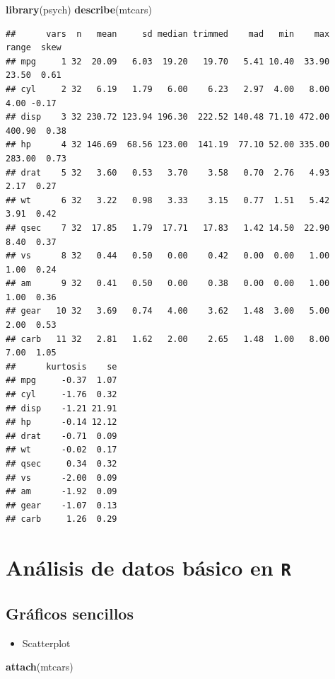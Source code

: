 \documentclass[]{book}
\newenvironment{Shaded}{\begin{snugshade}}{\end{snugshade}}
\newcommand{\KeywordTok}[1]{\textcolor[rgb]{0.13,0.29,0.53}{\textbf{#1}}}
\newcommand{\NormalTok}[1]{#1}
\providecommand{\tightlist}{%
  \setlength{\itemsep}{0pt}\setlength{\parskip}{0pt}}
\begin{document}
\begin{Shaded}
\begin{Highlighting}[]
\KeywordTok{library}\NormalTok{(psych)}
\KeywordTok{describe}\NormalTok{(mtcars)}
\end{Highlighting}
\end{Shaded}

\begin{verbatim}
##      vars  n   mean     sd median trimmed    mad   min    max  range  skew
## mpg     1 32  20.09   6.03  19.20   19.70   5.41 10.40  33.90  23.50  0.61
## cyl     2 32   6.19   1.79   6.00    6.23   2.97  4.00   8.00   4.00 -0.17
## disp    3 32 230.72 123.94 196.30  222.52 140.48 71.10 472.00 400.90  0.38
## hp      4 32 146.69  68.56 123.00  141.19  77.10 52.00 335.00 283.00  0.73
## drat    5 32   3.60   0.53   3.70    3.58   0.70  2.76   4.93   2.17  0.27
## wt      6 32   3.22   0.98   3.33    3.15   0.77  1.51   5.42   3.91  0.42
## qsec    7 32  17.85   1.79  17.71   17.83   1.42 14.50  22.90   8.40  0.37
## vs      8 32   0.44   0.50   0.00    0.42   0.00  0.00   1.00   1.00  0.24
## am      9 32   0.41   0.50   0.00    0.38   0.00  0.00   1.00   1.00  0.36
## gear   10 32   3.69   0.74   4.00    3.62   1.48  3.00   5.00   2.00  0.53
## carb   11 32   2.81   1.62   2.00    2.65   1.48  1.00   8.00   7.00  1.05
##      kurtosis    se
## mpg     -0.37  1.07
## cyl     -1.76  0.32
## disp    -1.21 21.91
## hp      -0.14 12.12
## drat    -0.71  0.09
## wt      -0.02  0.17
## qsec     0.34  0.32
## vs      -2.00  0.09
## am      -1.92  0.09
## gear    -1.07  0.13
## carb     1.26  0.29
\end{verbatim}

\chapter{\texorpdfstring{Análisis de datos básico en
\texttt{R}}{Análisis de datos básico en R}}\label{basic}

\section{Gráficos sencillos}\label{graficos-sencillos}

\begin{itemize}
\tightlist
\item
  Scatterplot
\end{itemize}

\begin{Shaded}
\begin{Highlighting}[]
\KeywordTok{attach}\NormalTok{(mtcars)}
\end{Highlighting}
\end{Shaded}
\end{document}
